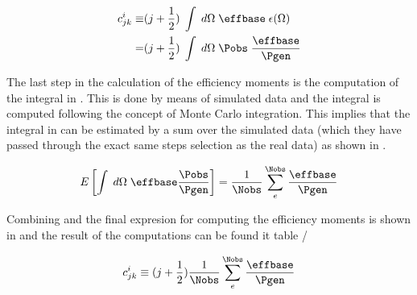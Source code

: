 \begin{center}
\begin{align}
   c^i_{jk}  \equiv &(j + \frac{1}{2}) \; \int \; d\Omega \; \effbase \; \epsilon(\Omega) \nonumber \\ 
                 = &(j + \frac{1}{2}) \; \int \; d\Omega \; \Pobs \; \frac{\effbase}{\Pgen}  
  \label{eff_moms_def}
\end{align}
\end{center}

\noindent The last step in the calculation of the efficiency moments is the computation of the integral in .
This is done by means of simulated data and the integral is computed following the concept of Monte Carlo integration. This implies
that the integral in  can be estimated by a sum over the simulated data (which they have passed through the exact
same steps selection as the real data) as shown in .   

\begin{center}
\begin{equation}
  E\left[ \int \; d\Omega \; \effbase \frac{\Pobs}{\Pgen} \right] = \frac{1}{\Nobs} \sum_e^{\Nobs} \frac{\effbase}{\Pgen}  
  \label{eff_moms_calc}
\end{equation}
\end{center}

\noindent Combining  and  the final expresion for computing the efficiency moments is shown
in  and the result of the computations can be found it table /  

\begin{center}
\begin{equation}
 c^i_{jk} \equiv (j + \frac{1}{2})  \frac{1}{\Nobs} \sum_e^{\Nobs} \frac{\effbase}{\Pgen}  
  \label{eff_moms_calc_final}
\end{equation}
\end{center}

